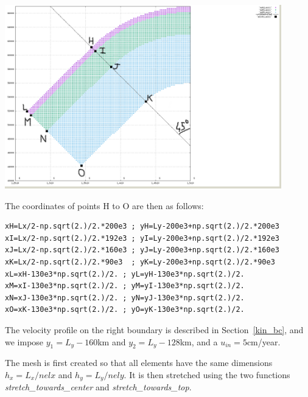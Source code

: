 \begin{center}
\includegraphics[width=12cm]{python_codes/fieldstone_67/images/mats3}
\end{center}

The coordinates of points H to O are then as follows:

\begin{lstlisting}
xH=Lx/2-np.sqrt(2.)/2.*200e3 ; yH=Ly-200e3+np.sqrt(2.)/2.*200e3
xI=Lx/2-np.sqrt(2.)/2.*192e3 ; yI=Ly-200e3+np.sqrt(2.)/2.*192e3
xJ=Lx/2-np.sqrt(2.)/2.*160e3 ; yJ=Ly-200e3+np.sqrt(2.)/2.*160e3
xK=Lx/2-np.sqrt(2.)/2.*90e3  ; yK=Ly-200e3+np.sqrt(2.)/2.*90e3
xL=xH-130e3*np.sqrt(2.)/2. ; yL=yH-130e3*np.sqrt(2.)/2.
xM=xI-130e3*np.sqrt(2.)/2. ; yM=yI-130e3*np.sqrt(2.)/2.
xN=xJ-130e3*np.sqrt(2.)/2. ; yN=yJ-130e3*np.sqrt(2.)/2.
xO=xK-130e3*np.sqrt(2.)/2. ; yO=yK-130e3*np.sqrt(2.)/2.
\end{lstlisting}

The velocity profile on the right boundary is described in Section~\ref{kin_bc}, and we 
impose $y_1=L_y-160$km and $y_2=L_y-128$km, and a $u_{in}=5$cm/year.

The mesh is first created so that all elements have the same dimensions $h_x=L_x/nelx$ and $h_y=L_y/nely$.
It is then stretched using the two functions {\sl stretch\_towards\_center} and 
{\sl stretch\_towards\_top}.


